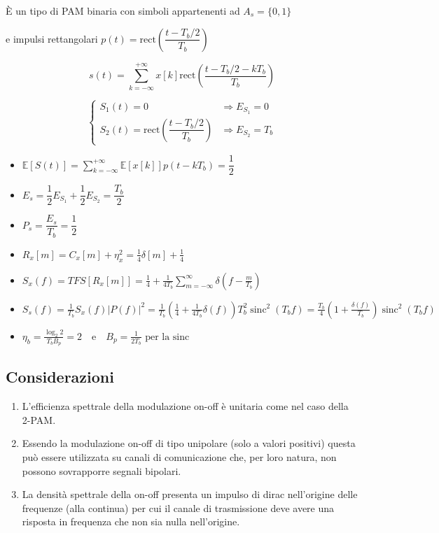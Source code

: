 È un tipo di PAM binaria con simboli appartenenti ad $A_s = \{0, 1\}$

e impulsi rettangolari  $p(t) = \text{rect}\left(\dfrac{t-T_b/2}{T_b}\right)$

\[
    s(t) = \sum_{k=-\infty}^{+\infty} x\left[k\right] \text{rect}\left(\dfrac{t-T_b/2-kT_b}{T_b}\right)
\]

\[
    \begin{cases}
        S_1(t) = 0                                            & \Rightarrow E_{S_1} = 0   \\
        S_2(t) = \text{rect}\left(\dfrac{t-T_b/2}{T_b}\right) & \Rightarrow E_{S_2} = T_b
    \end{cases}
\]


\begin{itemize}
    \item $
              \mathbb{E}[S(t)] = \sum_{k=-\infty}^{+\infty} \mathbb{E}[x[k]] p(t-kT_b) = \dfrac{1}{2}$
    \item $
              E_s = \dfrac{1}{2}E_{S_1} + \dfrac{1}{2}E_{S_2} = \dfrac{T_b}{2}
          $
    \item
          $
              P_s = \dfrac{E_s}{T_b} = \dfrac{1}{2}$
    \item $R_x[m] = C_x[m] + {\eta}_x^2 = \frac{1}{4} {\delta}[m] + \frac{1}{4}$

    \item $S_x(f) = TFS\left[ R_x[m] \right] = \frac{1}{4} + \frac{1}{4T_b} \sum_{m=-\infty}^{\infty} \delta\left(f - \frac{m}{T_b}\right)$
    \item $S_s(f) = \frac{1}{T_b} S_x(f)|P(f)|^2 = \frac{1}{T_b} \left( \frac{1}{4} + \frac{1}{4T_b} \delta(f) \right) T_b^2 \operatorname{sinc}^2(T_b f) = \frac{T_b}{4} \left( 1 + \frac{\delta(f)}{T_b} \right)\operatorname{sinc}^2(T_b f)$

    \item ${\eta}_b = \frac{\log_2{2}}{T_b B_p} = 2 \quad \text{e} \quad B_p = \frac{1}{2T_b} \text{ per la sinc}$
\end{itemize}



\subsection*{Considerazioni}
\begin{enumerate}
    \item L'efficienza spettrale della modulazione on-off è unitaria come nel caso della 2-PAM.
    \item Essendo la modulazione on-off di tipo unipolare (solo a valori positivi) questa può essere utilizzata su canali di comunicazione che, per loro natura, non possono sovrapporre segnali bipolari.
    \item La densità spettrale della on-off presenta un impulso di dirac nell'origine delle frequenze (alla continua) per cui il canale di trasmissione deve avere una risposta in frequenza che non sia nulla nell'origine.
\end{enumerate}
